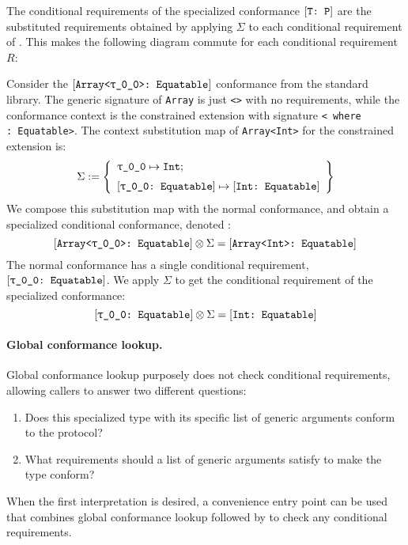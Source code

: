 \documentclass[../generics]{subfiles}
\begin{document}
The conditional requirements of the specialized conformance $[\texttt{T:~P}]$ are the substituted requirements obtained by applying $\Sigma$ to each conditional requirement of . This makes the following diagram commute for each conditional requirement~$R$:
\begin{quote}
\newcommand{\GetConditionalRequirements}{\def\arraystretch{0.65}\arraycolsep=0pt\begin{array}{c}\text{get conditional}\\\text{requirement}\end{array}}
\end{quote}

Consider the $\ConfReq{Array<\ttgp{0}{0}>}{Equatable}$ conformance from the standard library. The generic signature of \texttt{Array} is just \texttt{<>} with no requirements, while the conformance context is the constrained extension with signature \texttt{< where :~Equatable>}. The context substitution map of \texttt{Array<Int>} for the constrained extension is:
\[\Sigma := \SubstMapLongC{\SubstType{\ttgp{0}{0}}{Int}}{\SubstConf{\ttgp{0}{0}}{Int}{Equatable}}\]
We compose this substitution map with the normal conformance, and obtain a specialized conditional conformance, denoted :
\[
\ConfReq{Array<\ttgp{0}{0}>}{Equatable} \otimes \Sigma = \ConfReq{Array<Int>}{Equatable}
\]
The normal conformance has a single conditional requirement, $\ConfReq{\ttgp{0}{0}}{Equatable}$. We apply $\Sigma$ to get the conditional requirement of the specialized conformance:
\[
\ConfReq{\ttgp{0}{0}}{Equatable} \otimes \Sigma = \ConfReq{Int}{Equatable}
\]

\paragraph{Global conformance lookup.}
Global conformance lookup purposely does not check conditional requirements, allowing callers to answer two different questions:
\begin{enumerate}
\item Does this specialized type with its specific list of generic arguments conform to the protocol?
\item What requirements should a list of generic arguments satisfy to make the type conform?
\end{enumerate}
When the first interpretation is desired, a convenience entry point can be used that combines global conformance lookup followed by  to check any conditional requirements.
\end{document}
